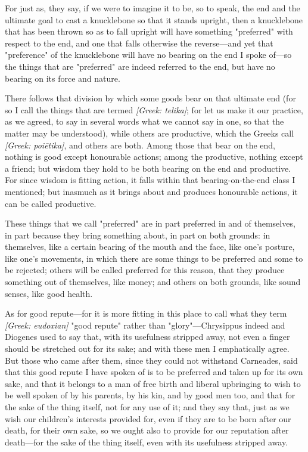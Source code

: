  For just as, they say, if we were to imagine it to be, so to speak, the end and the ultimate goal to cast a knucklebone so that it stands upright, then a knucklebone that has been thrown so as to fall upright will have something "preferred" with respect to the end, and one that falls otherwise the reverse—and yet that "preference" of the knucklebone will have no bearing on the end I spoke of—so the things that are "preferred" are indeed referred to the end, but have no bearing on its force and nature.

 There follows that division by which some goods bear on that ultimate end (for so I call the things that are termed \textit{[Greek: telika]}; for let us make it our practice, as we agreed, to say in several words what we cannot say in one, so that the matter may be understood), while others are productive, which the Greeks call \textit{[Greek: poiētika]}, and others are both. Among those that bear on the end, nothing is good except honourable actions; among the productive, nothing except a friend; but wisdom they hold to be both bearing on the end and productive. For since wisdom is fitting action, it falls within that bearing-on-the-end class I mentioned; but inasmuch as it brings about and produces honourable actions, it can be called productive.

 These things that we call "preferred" are in part preferred in and of themselves, in part because they bring something about, in part on both grounds: in themselves, like a certain bearing of the mouth and the face, like one's posture, like one's movements, in which there are some things to be preferred and some to be rejected; others will be called preferred for this reason, that they produce something out of themselves, like money; and others on both grounds, like sound senses, like good health.

 As for good repute—for it is more fitting in this place to call what they term \textit{[Greek: eudoxian]} "good repute" rather than "glory"—Chrysippus indeed and Diogenes used to say that, with its usefulness stripped away, not even a finger should be stretched out for its sake; and with these men I emphatically agree. But those who came after them, since they could not withstand Carneades, said that this good repute I have spoken of is to be preferred and taken up for its own sake, and that it belongs to a man of free birth and liberal upbringing to wish to be well spoken of by his parents, by his kin, and by good men too, and that for the sake of the thing itself, not for any use of it; and they say that, just as we wish our children's interests provided for, even if they are to be born after our death, for their own sake, so we ought also to provide for our reputation after death—for the sake of the thing itself, even with its usefulness stripped away.

